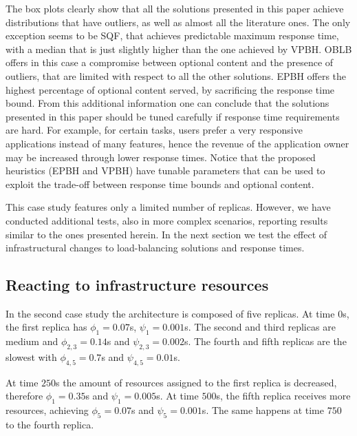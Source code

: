 The box plots clearly show that all the solutions presented in this
paper achieve distributions that have outliers, as well as almost all
the literature ones. The only exception seems to be SQF, that achieves
predictable maximum response time, with a median that is just slightly
higher than the one achieved by VPBH. OBLB offers in this case a
compromise between optional content and the presence of outliers, that
are limited with respect to all the other solutions. EPBH offers the
highest percentage of optional content served, by sacrificing the
response time bound. From this additional information one can conclude that
the solutions presented in this paper should be tuned carefully if
response time requirements are hard. For example, for certain tasks,
users prefer a very responsive applications instead of many features,
hence the revenue of the application owner may be increased through
lower response times. Notice that the proposed heuristics
(EPBH and VPBH) have tunable parameters that can be used to exploit
the trade-off between response time bounds and optional content.

This case study features only a limited number of replicas. However,
we have conducted additional tests, also in more complex scenarios,
reporting results similar to the ones presented herein. In the next
section we test the effect of infrastructural changes to
load-balancing solutions and response times.

\subsection{Reacting to infrastructure resources}

In the second case study the architecture is composed of five
replicas. At time $0$s, the first replica has $\phi_1 = 0.07$s,
$\psi_1 = 0.001$s. The second and third replicas are medium and
$\phi_{2,3} = 0.14$s and $\psi_{2,3} = 0.002$s. The fourth and fifth
replicas are the slowest with $\phi_{4,5} = 0.7$s and $\psi_{4,5} =
0.01$s.

At time $250$s the amount of resources assigned to the first replica
is decreased, therefore $\phi_1 = 0.35$s and $\psi_1 = 0.005$s. At
time $500$s, the fifth replica receives more resources, achieving
$\phi_5 = 0.07$s and $\psi_5 = 0.001$s. The same happens at time $750$
to the fourth replica.

